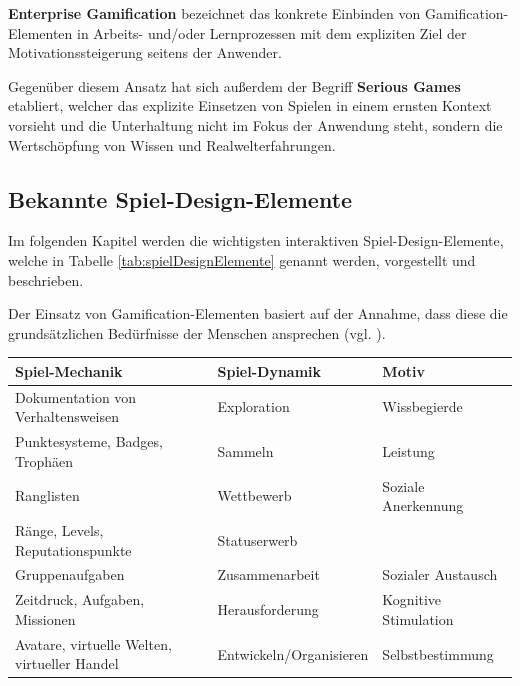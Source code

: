 \documentclass[bibliography=totoc,listof=totoc,BCOR=5mm,DIV=12,oneside]{scrbook}
\begin{document}
\par \bigskip \textbf{Enterprise Gamification} bezeichnet das konkrete Einbinden von Gamification-Elementen in Arbeits- und/oder Lernprozessen mit dem expliziten Ziel der Motivationssteigerung seitens der Anwender.

\par \bigskip Gegenüber diesem Ansatz hat sich außerdem der Begriff \textbf{Serious Games} etabliert, welcher das explizite Einsetzen von Spielen in einem ernsten Kontext vorsieht und die Unterhaltung nicht im Fokus der Anwendung steht, sondern die Wertschöpfung von Wissen und Realwelterfahrungen. 

\newpage
\subsection{Bekannte Spiel-Design-Elemente} \label{sub:grundlagenSpielDesignElemente}

\par Im folgenden Kapitel werden die wichtigsten interaktiven Spiel-Design-Elemente, welche in Tabelle \ref{tab:spielDesignElemente} genannt werden, vorgestellt und beschrieben. 
\par Der Einsatz von Gamification-Elementen basiert auf der Annahme, dass diese die grundsätzlichen Bedürfnisse der Menschen ansprechen (vgl. \citep[Kapitel 1.1 Enterprise Gamification - Vorgehen und Anwendung, Seite 5]{Sailer2016}).

\bigskip
\begin{tabularx}{\textwidth}{X|l|l}
	\toprule
	\textbf{Spiel-Mechanik} & \textbf{Spiel-Dynamik} & \textbf{Motiv}\\ \midrule
	Dokumentation von Verhaltensweisen & Exploration & Wissbegierde\\
	Punktesysteme, Badges, Trophäen & Sammeln  & Leistung\\
	Ranglisten & Wettbewerb & Soziale Anerkennung\\ 
	Ränge, Levels, Reputationspunkte & Statuserwerb  & \\
	Gruppenaufgaben & Zusammenarbeit  & Sozialer Austausch\\
	Zeitdruck, Aufgaben, Missionen & Herausforderung & Kognitive Stimulation\\ 
	Avatare, virtuelle Welten, virtueller Handel & Entwickeln/Organisieren & Selbstbestimmung \\ 
	\bottomrule
\end{tabularx}
\label{tab:spielDesignElemente}
\end{document}
